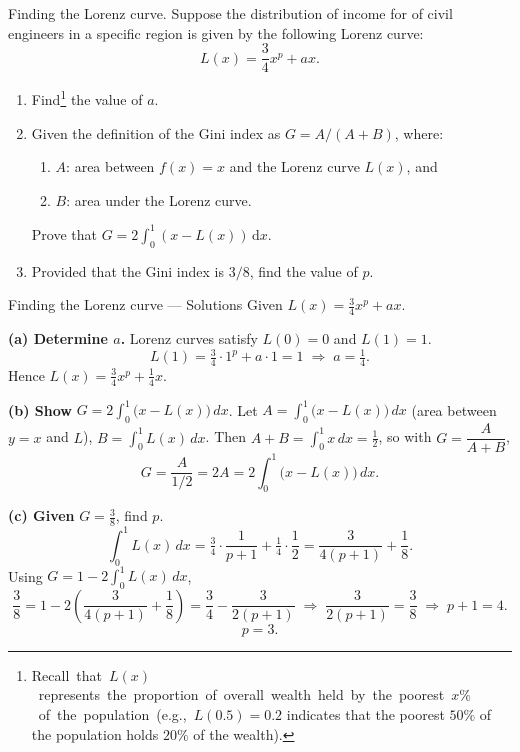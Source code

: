 \documentclass[9pt]{beamer}
\begin{document}
\begin{frame}{Finding the Lorenz curve.}
    Suppose the distribution of income for of civil engineers in a specific region is given by the following Lorenz curve:  
    \[
    L(x) = \frac{3}{4}x^p + ax.
    \]  
    \begin{enumerate}[leftmargin = 0.5cm, label = (\alph*), rightmargin = 0.2cm]
            \item Find\footnote{
            \mbox{Recall that $L(x)$ represents the proportion of overall wealth held by the poorest $x\%$ of the population (e.g., $L(0.5) = 0.2$} 
            indicates that  the poorest $50\%$ of the population holds $20\%$ of the wealth).
            } the value of $a$.
            \item Given the definition of the Gini index as $G = A/(A+B)$, where:
            \begin{enumerate}[leftmargin = 0.5cm, label = $\bullet$, rightmargin = 0.2cm]
                \item $A$: area between $f(x) = x$ and the Lorenz curve $L(x)$, and 
                \item $B$: area under the Lorenz curve. 
            \end{enumerate}
            Prove that $G = 2 \int_0^1 (x - L(x)) \, \mathrm{d}x$.
            \item Provided that the Gini index is $3/8$, find the value of $p$.
    \end{enumerate}
\end{frame}

\begin{frame}{Finding the Lorenz curve — Solutions}
    \small
    Given $L(x)=\tfrac{3}{4}x^{p}+ax$.
    
    \textbf{(a) Determine $a$.}
    Lorenz curves satisfy $L(0)=0$ and $L(1)=1$.
    \[
    L(1)=\tfrac{3}{4}\cdot 1^{p}+a\cdot 1=1 \;\Rightarrow\; a=\boxed{\tfrac{1}{4}}.
    \]
    Hence $L(x)=\tfrac{3}{4}x^{p}+\tfrac{1}{4}x$.
    
    \medskip
    \textbf{(b) Show } $\displaystyle G=2\int_{0}^{1}\big(x-L(x)\big)\,dx$.
    Let $A=\int_{0}^{1}\big(x-L(x)\big)\,dx$ (area between $y=x$ and $L$), $B=\int_{0}^{1}L(x)\,dx$.
    Then $A+B=\int_{0}^{1}x\,dx=\tfrac{1}{2}$, so with $G=\dfrac{A}{A+B}$,
    \[
    G=\frac{A}{1/2}=2A=2\int_{0}^{1}\big(x-L(x)\big)\,dx.
    \]
    
    \medskip
    \textbf{(c) Given } $G=\tfrac{3}{8}$, find $p$.
    \[
    \int_{0}^{1} L(x)\,dx=\tfrac{3}{4}\cdot\frac{1}{p+1}+\tfrac{1}{4}\cdot\frac{1}{2}
    =\frac{3}{4(p+1)}+\frac{1}{8}.
    \]
    Using $G=1-2\int_{0}^{1}L(x)\,dx$,
    \[
    \frac{3}{8}=1-2\!\left(\frac{3}{4(p+1)}+\frac{1}{8}\right)
    =\frac{3}{4}-\frac{3}{2(p+1)}
    \;\Rightarrow\;
    \frac{3}{2(p+1)}=\frac{3}{8}\;\Rightarrow\; p+1=4.
    \]
    \[
    \boxed{p=3}.
    \]
\end{frame}
\end{document}
